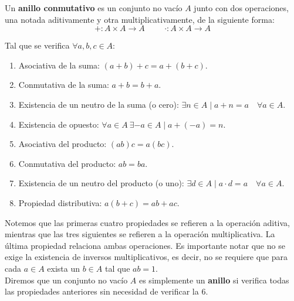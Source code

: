 \begin{definicion}
    Un \textbf{anillo conmutativo} es un conjunto no vacío $A$ junto con dos operaciones, una notada aditivamente y otra
    multiplicativamente, de la siguiente forma:
    \begin{equation*}
        +:A\times A\longrightarrow A
        \hspace{1cm}
        \cdot:A\times A\longrightarrow A
    \end{equation*}
    
    Tal que se verifica $\forall a,b,c \in A$:
    \begin{enumerate}
        \item Asociativa de la suma: $(a+b)+c = a+(b+c)$.
        \item Conmutativa de la suma: $a+b = b+a$.
        \item Existencia de un neutro de la suma (o cero): $\exists n \in A \mid a + n = a \quad \forall a\in A$.
        \item Existencia de opuesto: $\forall a\in A~\exists -a \in A \mid a + (-a) = n$.\label{item:opuesto}
        \item Asociativa del producto: $(ab)c = a(bc)$.
        \item Conmutativa del producto: $ab=ba$.
        \item Existencia de un neutro del producto (o uno): $\exists d \in A \mid a \cdot d = a\quad \forall a\in A$.
        \item Propiedad distributiva: $a(b+c) = ab + ac$.
    \end{enumerate}
\end{definicion}

Notemos que las primeras cuatro propiedades se refieren a la operación aditiva, mientras que las tres siguientes se refieren a la operación multiplicativa. La última propiedad relaciona ambas operaciones. Es importante notar que no se exige la existencia de inversos multiplicativos, es decir, no se requiere que para cada $a \in A$ exista un $b \in A$ tal que $ab = 1$.\\

Diremos que un conjunto no vacío $A$ es simplemente un \textbf{anillo} si verifica todas las propiedades anteriores sin necesidad de
verificar la $6$.

